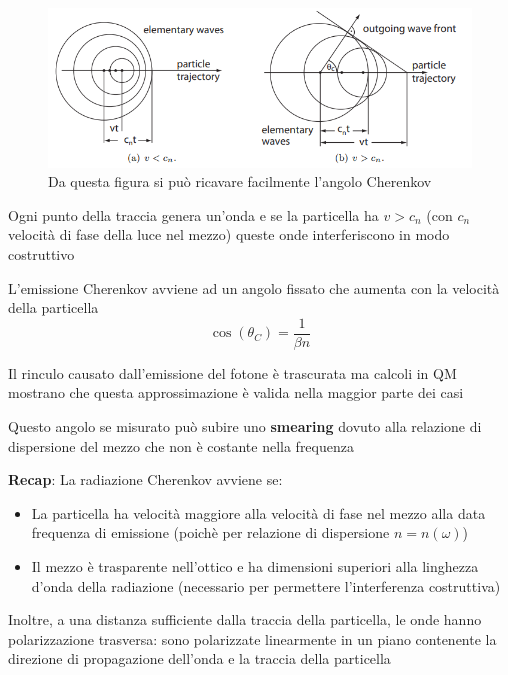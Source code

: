 \hspace{-20pt}
\begin{minipage}{0.6\textwidth}
    \begin{figure}[H]
        \centering
        \includegraphics[width=\textwidth,frame]{Chapters/images/Particle_identification/image-20220316193152123.png}
        \captionsetup{width=\textwidth}
        \caption{Da questa figura si può ricavare facilmente l'angolo Cherenkov}
        \label{fig:}
    \end{figure}
\end{minipage} \hspace{5pt}
\begin{minipage}{0.35\textwidth}

    Ogni punto della traccia genera un'onda e se la particella ha $v>c_n$ (con $c_n$ velocità di fase della luce nel mezzo) queste onde interferiscono in modo costruttivo

\end{minipage}
L'emissione Cherenkov avviene ad un angolo fissato che aumenta con la velocità della particella
\[\cos(\theta_C)=\frac{1}{\beta n}\]
\begin{note}[Rinculo]
    Il rinculo causato dall'emissione del fotone è trascurata ma calcoli in QM mostrano che questa approssimazione è valida nella maggior parte dei casi

\end{note}
Questo angolo se misurato può subire uno \textbf{smearing}  dovuto alla relazione di dispersione del mezzo che non è costante nella frequenza

\begin{tcolorbox}[colback=NavyBlue!5]
\textbf{Recap}: La radiazione Cherenkov avviene se:
\begin{itemize}
    \item La particella ha velocità maggiore alla velocità di fase nel mezzo alla data frequenza di emissione (poichè per relazione di dispersione $n=n(\omega)$)
\item Il mezzo è trasparente nell'ottico e ha dimensioni superiori alla linghezza d'onda della radiazione (necessario per permettere l'interferenza costruttiva)

\end{itemize}

Inoltre, a una distanza sufficiente dalla traccia della particella, le onde hanno polarizzazione trasversa: sono polarizzate linearmente in un piano contenente la direzione di propagazione dell'onda e la traccia della particella
\end{tcolorbox}

